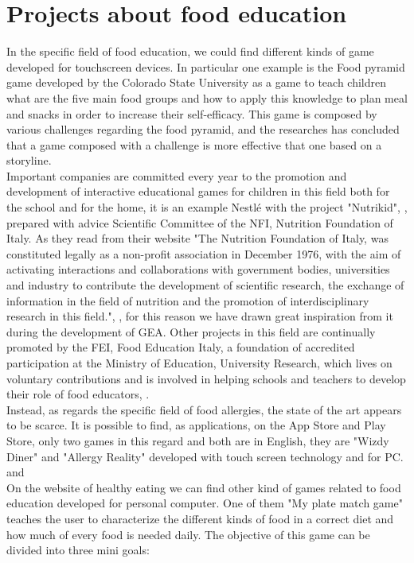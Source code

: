 \section{Projects about food education}
In the specific field of food education, we could find different kinds of game developed for touchscreen devices. In particular one example is the Food pyramid game developed by the Colorado State University \cite{Serrano} as a game to teach children what are the five main food groups and how to apply this knowledge to plan meal and snacks in order to increase their self-efficacy. This game is composed by various challenges regarding the food pyramid, and the researches has concluded that a game composed with a challenge is more effective that one based on a storyline.\\
Important companies are committed every year to the promotion and development of interactive educational games for children in this field both for the school and for the home, it is an example Nestl\'e with the project "Nutrikid", \cite{Nutrikid}, prepared with advice Scientific Committee of the NFI, Nutrition Foundation of Italy. As they read from their website "The Nutrition Foundation of Italy, was constituted legally as a non-profit association in December 1976, with the aim of activating interactions and collaborations with government bodies, universities and industry to contribute the development of scientific research, the exchange of information in the field of nutrition and the promotion of interdisciplinary research in this field.", \cite{NFI}, for this reason we have drawn great inspiration from it during the development of GEA. Other projects in this field are continually promoted by the FEI, Food Education Italy, a foundation of accredited participation at the Ministry of Education, University Research, which lives on voluntary contributions and is involved in helping schools and teachers to develop their role of food educators, \cite{FEI}.\\
Instead, as regards the specific field of food allergies, the state of the art appears to be scarce. It is possible to find, as applications, on the App Store and Play Store, only two games in this regard and both are in English, they are "Wizdy Diner" and "Allergy Reality" developed with touch screen technology and for PC. \cite{Wizdy} and \cite{Allergy}\\
On the website of healthy eating \cite{Myplate} we can find other kind of games related to food education developed for personal computer. One of them "My plate match game" teaches the user to characterize the different kinds of food in a correct diet and how much of every food is needed daily. The objective of this game can be divided into three mini goals:
